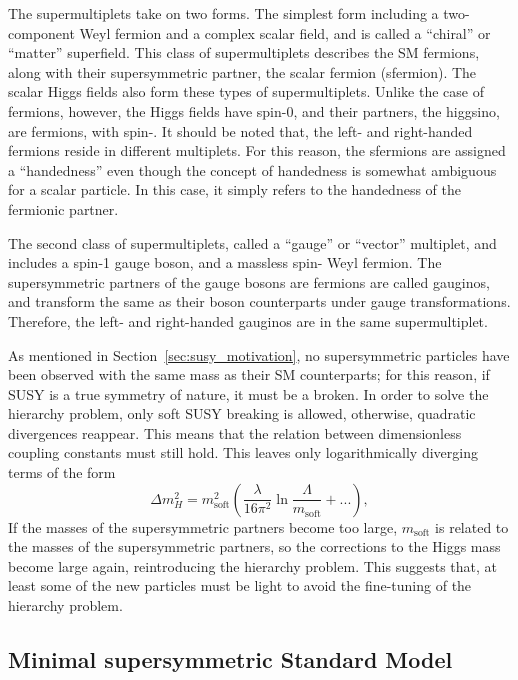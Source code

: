 The supermultiplets take on two forms.
The simplest form including a two-component Weyl fermion and a complex scalar
field, and is called a ``chiral'' or ``matter'' superfield.
This class of supermultiplets describes the SM fermions, along with their
supersymmetric partner, the scalar fermion (sfermion).
The scalar Higgs fields also form these types of supermultiplets.
Unlike the case of fermions, however, the Higgs fields have spin-0, and their
partners, the higgsino, are fermions, with spin-.
It should be noted that, the left- and right-handed fermions reside in
different multiplets.
For this reason, the sfermions are assigned a ``handedness'' even though
the concept of handedness is somewhat ambiguous for a scalar particle.
In this case, it simply refers to the handedness of the fermionic partner.

The second class of supermultiplets, called a ``gauge'' or ``vector''
multiplet, and includes a spin-1 gauge boson, and a massless
spin- Weyl fermion.
The supersymmetric partners of the gauge bosons are fermions are called
gauginos, and transform the same as their boson counterparts under gauge
transformations.
Therefore, the left- and right-handed gauginos are in the same supermultiplet.

As mentioned in Section~\ref{sec:susy_motivation}, no supersymmetric particles
have been observed with the same mass as their SM counterparts; for this
reason, if SUSY is a true symmetry of nature, it must be a broken.
In order to solve the hierarchy problem, only soft SUSY breaking is allowed,
otherwise, quadratic divergences reappear.
This means that the relation between dimensionless coupling constants must
still hold.
This leaves only logarithmically diverging terms of the form
\begin{equation}
  \Delta m_{H}^2 =
  m_\mathrm{soft}^2
  \left(
    \frac{\lambda}{16\pi^2}
    \ln \frac{\Lambda}{m_\mathrm{soft}}
    + ...
  \right),
\end{equation}
If the masses of the supersymmetric partners become too large,
$m_\mathrm{soft}$ is related to the masses of the supersymmetric partners, so
the corrections to the Higgs mass become large again, reintroducing the
hierarchy problem.
This suggests that, at least some of the new particles must be light to avoid
the fine-tuning of the hierarchy problem.

\FloatBarrier
\subsection{Minimal supersymmetric Standard Model}
\label{sec:mssm}

